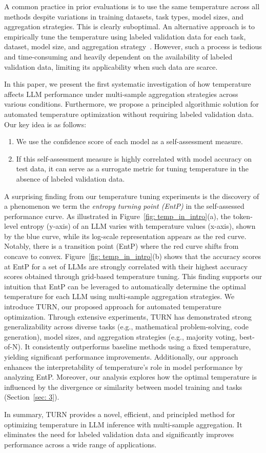 A common practice in prior evaluations is to use the same temperature across all methods despite variations in training datasets, task types, model sizes, and aggregation strategies. This is clearly suboptimal. An alternative approach is to empirically tune the temperature using labeled validation data for each task, dataset, model size, and aggregation strategy~\cite{zhang2024scaling,dhuliawala2024adaptive}. However, such a process is tedious and time-consuming and heavily dependent on the availability of labeled validation data, limiting its applicability when such data are scarce.

In this paper, we present the first systematic investigation of how temperature affects LLM performance under multi-sample aggregation strategies across various conditions. Furthermore, we propose a principled algorithmic solution for automated temperature optimization without requiring labeled validation data. Our key idea is as follows:
\begin{enumerate}
    \item We use the confidence score of each model as a self-assessment measure.
    \item If this self-assessment measure is highly correlated with model accuracy on test data, it can serve as a surrogate metric for tuning temperature in the absence of labeled validation data.
\end{enumerate}
A surprising finding from our temperature tuning experiments is the discovery of a phenomenon we term the \emph{entropy turning point (EntP)} in the self-assessed performance curve. As illustrated in Figure~\ref{fig: temp_in_intro}(a), the token-level entropy (y-axis) of an LLM varies with temperature values (x-axis), shown by the blue curve, while its log-scale representation appears as the red curve. Notably, there is a transition point (EntP) where the red curve shifts from concave to convex. Figure~\ref{fig: temp_in_intro}(b)
shows that the accuracy scores at EntP for a set of LLMs are strongly correlated with their highest accuracy scores obtained through grid-based temperature tuning.
This finding supports our intuition that EntP can be leveraged to automatically determine the optimal temperature for each LLM using multi-sample aggregation strategies.
We introduce \textsc{TURN}, our proposed approach for automated temperature optimization. Through extensive experiments, TURN has demonstrated strong generalizability across diverse tasks (e.g., mathematical problem-solving, code generation), model sizes, and aggregation strategies (e.g., majority voting, best-of-N). It consistently outperforms baseline methods using a fixed temperature, yielding significant performance improvements. Additionally, our approach enhances the interpretability of temperature’s role in model performance by analyzing EntP.  Moreover, our analysis explores how the optimal temperature is influenced by the divergence or similarity between model training and tasks (Section~\ref{sec: 3}).

In summary, TURN provides a novel, efficient, and principled method for optimizing temperature in LLM inference with multi-sample aggregation. It eliminates the need for labeled validation data and significantly improves performance across a wide range of applications.
